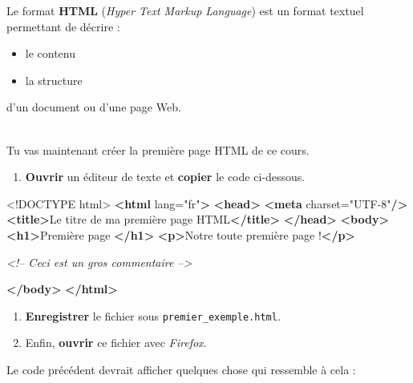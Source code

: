 \documentclass[a4paper,17pt]{extarticle}
\newenvironment{eleve}%
{\begin{activite}\color{noiramu}\\}
{\end{activite}}
\providecommand{\tightlist}{%
      \setlength{\itemsep}{0pt}\setlength{\parskip}{0pt}}
\newenvironment{Shaded}{}{}
\newcommand{\KeywordTok}[1]{\textcolor[rgb]{0.00,0.44,0.13}{\textbf{{#1}}}}
\newcommand{\DataTypeTok}[1]{\textcolor[rgb]{0.56,0.13,0.00}{{#1}}}
\newcommand{\StringTok}[1]{\textcolor[rgb]{0.25,0.44,0.63}{{#1}}}
\newcommand{\CommentTok}[1]{\textcolor[rgb]{0.38,0.63,0.69}{\textit{{#1}}}}
\newcommand{\OtherTok}[1]{\textcolor[rgb]{0.00,0.44,0.13}{{#1}}}
\newcommand{\NormalTok}[1]{{#1}}
\begin{document}
    Le format \textbf{HTML} (\emph{Hyper Text Markup Language}) est un
format textuel permettant de décrire :

\begin{itemize}
\tightlist
\item
  le contenu
\item
  la structure
\end{itemize}

d'un document ou d'une page Web.
\begin{eleve}
    Tu vas maintenant créer la première page HTML de ce cours.

\begin{enumerate}
\def\labelenumi{\arabic{enumi}.}
\tightlist
\item
  \textbf{Ouvrir} un éditeur de texte et \textbf{copier} le code
  ci-dessous.
\end{enumerate}

\begin{Shaded}
\begin{Highlighting}[]
\DataTypeTok{<!DOCTYPE }\NormalTok{html}\DataTypeTok{>}
\KeywordTok{<html}\OtherTok{ lang=}\StringTok{"fr"}\KeywordTok{>}
\KeywordTok{<head>}
    \KeywordTok{<meta}\OtherTok{ charset=}\StringTok{"UTF-8"}\KeywordTok{/>}
    \KeywordTok{<title>}\NormalTok{Le titre de ma première page HTML}\KeywordTok{</title>}
\KeywordTok{</head>}
\KeywordTok{<body>}
    \KeywordTok{<h1>}\NormalTok{Première page }\KeywordTok{</h1>}
    \KeywordTok{<p>}\NormalTok{Notre toute première page !}\KeywordTok{</p>}

    \CommentTok{<!-- Ceci est un gros commentaire -->}
    
\KeywordTok{</body>}
\KeywordTok{</html>}
\end{Highlighting}
\end{Shaded}

\begin{enumerate}
\def\labelenumi{\arabic{enumi}.}
\setcounter{enumi}{1}
\tightlist
\item
  \textbf{Enregistrer} le fichier sous \texttt{premier\_exemple.html}.
\item
  Enfin, \textbf{ouvrir} ce fichier avec \emph{Firefox}.
\end{enumerate}
        
        \end{eleve}\begin{reponse}
    Le code précédent devrait afficher quelques chose qui ressemble à cela :


\end{reponse}
\end{document}
